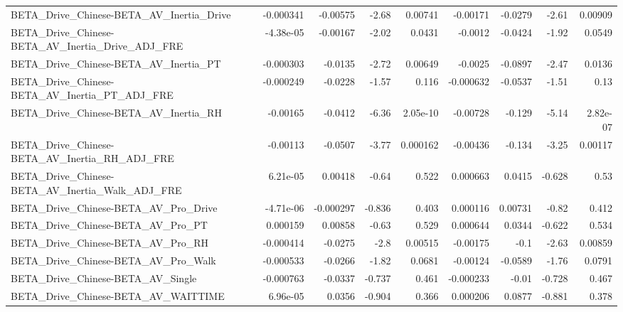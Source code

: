 \begin{tabular}{lrrrrrrrr}
BETA\_Drive\_Chinese-BETA\_AV\_Inertia\_Drive           &   -0.000341 &     -0.00575 &    -2.68 &  0.00741 &   -0.00171 &     -0.0279 &        -2.61 &       0.00909 \\
BETA\_Drive\_Chinese-BETA\_AV\_Inertia\_Drive\_ADJ\_FRE   &   -4.38e-05 &     -0.00167 &    -2.02 &   0.0431 &    -0.0012 &     -0.0424 &        -1.92 &        0.0549 \\
BETA\_Drive\_Chinese-BETA\_AV\_Inertia\_PT              &   -0.000303 &      -0.0135 &    -2.72 &  0.00649 &    -0.0025 &     -0.0897 &        -2.47 &        0.0136 \\
BETA\_Drive\_Chinese-BETA\_AV\_Inertia\_PT\_ADJ\_FRE      &   -0.000249 &      -0.0228 &    -1.57 &    0.116 &  -0.000632 &     -0.0537 &        -1.51 &          0.13 \\
BETA\_Drive\_Chinese-BETA\_AV\_Inertia\_RH              &    -0.00165 &      -0.0412 &    -6.36 & 2.05e-10 &   -0.00728 &      -0.129 &        -5.14 &      2.82e-07 \\
BETA\_Drive\_Chinese-BETA\_AV\_Inertia\_RH\_ADJ\_FRE      &    -0.00113 &      -0.0507 &    -3.77 & 0.000162 &   -0.00436 &      -0.134 &        -3.25 &       0.00117 \\
BETA\_Drive\_Chinese-BETA\_AV\_Inertia\_Walk\_ADJ\_FRE    &    6.21e-05 &      0.00418 &    -0.64 &    0.522 &   0.000663 &      0.0415 &       -0.628 &          0.53 \\
BETA\_Drive\_Chinese-BETA\_AV\_Pro\_Drive               &   -4.71e-06 &    -0.000297 &   -0.836 &    0.403 &   0.000116 &     0.00731 &        -0.82 &         0.412 \\
BETA\_Drive\_Chinese-BETA\_AV\_Pro\_PT                  &    0.000159 &      0.00858 &    -0.63 &    0.529 &   0.000644 &      0.0344 &       -0.622 &         0.534 \\
BETA\_Drive\_Chinese-BETA\_AV\_Pro\_RH                  &   -0.000414 &      -0.0275 &     -2.8 &  0.00515 &   -0.00175 &        -0.1 &        -2.63 &       0.00859 \\
BETA\_Drive\_Chinese-BETA\_AV\_Pro\_Walk                &   -0.000533 &      -0.0266 &    -1.82 &   0.0681 &   -0.00124 &     -0.0589 &        -1.76 &        0.0791 \\
BETA\_Drive\_Chinese-BETA\_AV\_Single                  &   -0.000763 &      -0.0337 &   -0.737 &    0.461 &  -0.000233 &       -0.01 &       -0.728 &         0.467 \\
BETA\_Drive\_Chinese-BETA\_AV\_WAITTIME                &    6.96e-05 &       0.0356 &   -0.904 &    0.366 &   0.000206 &      0.0877 &       -0.881 &         0.378 \\

\end{tabular}
